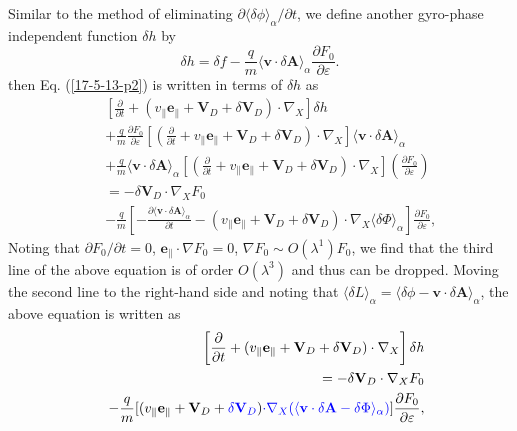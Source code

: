 \documentclass{article}
\newcommand{\tmcolor}[2]{{\color{#1}{#2}}}
\begin{document}
Similar to the method of eliminating $\partial \langle \delta \phi
\rangle_{\alpha} / \partial t$, we define another gyro-phase independent
function $\delta h$ by
\begin{equation}
  \delta h = \delta f - \frac{q}{m} \langle \mathbf{v} \cdot \delta \mathbf{A}
  \rangle_{\alpha} \frac{\partial F_0}{\partial \varepsilon} .
\end{equation}
then Eq. (\ref{17-5-13-p2}) is written in terms of $\delta h$ as
\begin{eqnarray}
  &  & \left[ \frac{\partial}{\partial t} + (v_{\parallel}
  \mathbf{e}_{\parallel} +\mathbf{V}_D + \delta \mathbf{V}_D) \cdot \nabla_X
  \right] \delta h \nonumber\\
  &  & + \frac{q}{m}  \frac{\partial F_0}{\partial \varepsilon} \left[ \left(
  \frac{\partial}{\partial t} + v_{\parallel} \mathbf{e}_{\parallel}
  +\mathbf{V}_D + \delta \mathbf{V}_D \right) \cdot \nabla_X \right] \langle
  \mathbf{v} \cdot \delta \mathbf{A} \rangle_{\alpha} \nonumber\\
  &  & + \frac{q}{m} \langle \mathbf{v} \cdot \delta \mathbf{A}
  \rangle_{\alpha} \left[ \left( \frac{\partial}{\partial t} + v_{\parallel}
  \mathbf{e}_{\parallel} +\mathbf{V}_D + \delta \mathbf{V}_D \right) \cdot
  \nabla_X \right] \left( \frac{\partial F_0}{\partial \varepsilon} \right)
  \nonumber\\
  &  & = - \delta \mathbf{V}_D \cdot \nabla_X F_0 \nonumber\\
  &  & - \frac{q}{m} \left[ - \frac{\partial \langle \mathbf{v} \cdot \delta
  \mathbf{A} \rangle_{\alpha}}{\partial t} - (v_{\parallel}
  \mathbf{e}_{\parallel} +\mathbf{V}_D + \delta \mathbf{V}_D) \cdot \nabla_X
  \langle \delta \Phi \rangle_{\alpha} \right] \frac{\partial F_0}{\partial
  \varepsilon}, 
\end{eqnarray}
Noting that $\partial F_0 / \partial t = 0$, $\mathbf{e}_{\parallel} \cdot
\nabla F_0 = 0$, $\nabla F_0 \sim O (\lambda^1) F_0$, we find that the third
line of the above equation is of order $O (\lambda^3)$ and thus can be
dropped. Moving the second line to the right-hand side and noting that
$\langle \delta L \rangle_{\alpha} = \langle \delta \phi -\mathbf{v} \cdot
\delta \mathbf{A} \rangle_{\alpha}$, the above equation is written as
\begin{eqnarray}
  &  & \left[ \frac{\partial}{\partial t} + (v_{\parallel}
  \mathbf{e}_{\parallel} +\mathbf{V}_D + \delta \mathbf{V}_D) \cdot \nabla_X
  \right] \delta h \nonumber\\
  &  & = - \delta \mathbf{V}_D \cdot \nabla_X F_0 \nonumber\\
  &  & - \frac{q}{m} [(v_{\parallel} \mathbf{e}_{\parallel} +\mathbf{V}_D +
  \tmcolor{blue}{\delta \mathbf{V}_D}) \tmcolor{blue}{\cdot \nabla_X (\langle
  \mathbf{v} \cdot \delta \mathbf{A}- \delta \Phi \rangle_{\alpha})}]
  \frac{\partial F_0}{\partial \varepsilon},  \label{19-1-3-e1}
\end{eqnarray}
\end{document}

